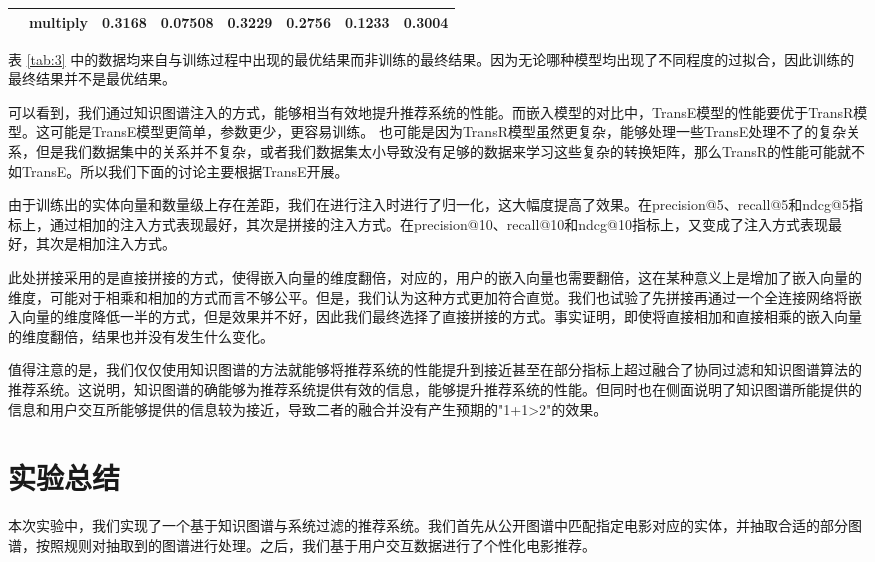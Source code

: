 \documentclass{ctexart}
\begin{document}
\begin{sloppypar}
\begin{table}[h]
{\begin{tabular}{cccccccc}
                                                                     & \textbf{multiply} & 0.3168               & 0.07508           & 0.3229          & 0.2756                & 0.1233             & 0.3004           \\
                \bottomrule
            \end{tabular}
        }
    \end{table}
表 \ref{tab:3} 中的数据均来自与训练过程中出现的最优结果而非训练的最终结果。因为无论哪种模型均出现了不同程度的过拟合，因此训练的最终结果并不是最优结果。

可以看到，我们通过知识图谱注入的方式，能够相当有效地提升推荐系统的性能。而嵌入模型的对比中，TransE模型的性能要优于TransR模型。这可能是TransE模型更简单，参数更少，更容易训练。
也可能是因为TransR模型虽然更复杂，能够处理一些TransE处理不了的复杂关系，但是我们数据集中的关系并不复杂，或者我们数据集太小导致没有足够的数据来学习这些复杂的转换矩阵，那么TransR的性能可能就不如TransE。所以我们下面的讨论主要根据TransE开展。

由于训练出的实体向量和数量级上存在差距，我们在进行注入时进行了归一化，这大幅度提高了效果。在precision@5、recall@5和ndcg@5指标上，通过相加的注入方式表现最好，其次是拼接的注入方式。在precision@10、recall@10和ndcg@10指标上，又变成了注入方式表现最好，其次是相加注入方式。

此处拼接采用的是直接拼接的方式，使得嵌入向量的维度翻倍，对应的，用户的嵌入向量也需要翻倍，这在某种意义上是增加了嵌入向量的维度，可能对于相乘和相加的方式而言不够公平。但是，我们认为这种方式更加符合直觉。我们也试验了先拼接再通过一个全连接网络将嵌入向量的维度降低一半的方式，但是效果并不好，因此我们最终选择了直接拼接的方式。事实证明，即使将直接相加和直接相乘的嵌入向量的维度翻倍，结果也并没有发生什么变化。

值得注意的是，我们仅仅使用知识图谱的方法就能够将推荐系统的性能提升到接近甚至在部分指标上超过融合了协同过滤和知识图谱算法的推荐系统。这说明，知识图谱的确能够为推荐系统提供有效的信息，能够提升推荐系统的性能。但同时也在侧面说明了知识图谱所能提供的信息和用户交互所能够提供的信息较为接近，导致二者的融合并没有产生预期的"1+1>2"的效果。

\section{实验总结}
    本次实验中，我们实现了一个基于知识图谱与系统过滤的推荐系统。我们首先从公开图谱中匹配指定电影对应的实体，并抽取合适的部分图谱，按照规则对抽取到的图谱进行处理。之后，我们基于用户交互数据进行了个性化电影推荐。


\end{sloppypar}
\end{document}
